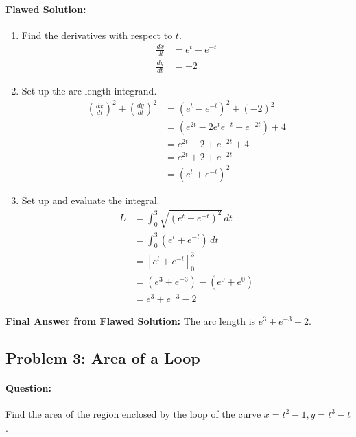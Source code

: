 \documentclass{article}
\begin{document}
\paragraph{Flawed Solution:}
\begin{enumerate}
    \item Find the derivatives with respect to $t$.
    \begin{align*}
    \frac{dx}{dt} &= e^t - e^{-t} \\
    \frac{dy}{dt} &= -2
    \end{align*}
    \item Set up the arc length integrand.
    \begin{align*}
    \left(\frac{dx}{dt}\right)^2 + \left(\frac{dy}{dt}\right)^2 &= (e^t - e^{-t})^2 + (-2)^2 \\
    &= (e^{2t} - 2e^t e^{-t} + e^{-2t}) + 4 \\
    &= e^{2t} - 2 + e^{-2t} + 4 \\
    &= e^{2t} + 2 + e^{-2t} \\
    &= (e^t + e^{-t})^2
    \end{align*}
    \item Set up and evaluate the integral.
    \begin{align*}
    L &= \int_0^3 \sqrt{(e^t + e^{-t})^2} \, dt \\
      &= \int_0^3 (e^t + e^{-t}) \, dt \\
      &= \left[ e^t + e^{-t} \right]_0^3 \\
      &= (e^3 + e^{-3}) - (e^0 + e^0) \\
      &= e^3 + e^{-3} - 2
    \end{align*}
\end{enumerate}
\textbf{Final Answer from Flawed Solution:} The arc length is $e^3 + e^{-3} - 2$.

\subsection{Problem 3: Area of a Loop}
\paragraph{Question:} Find the area of the region enclosed by the loop of the curve $x=t^2-1, y=t^3-t$.
\end{document}

